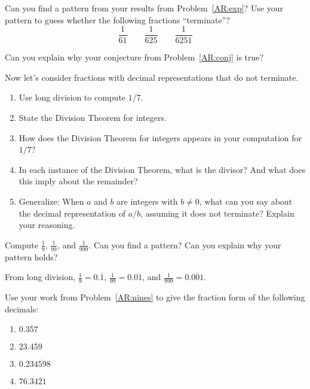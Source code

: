 \begin{prob}\label{AR:conj}
Can you find a pattern from your results from Problem~\ref{AR:exp}?
Use your pattern to guess whether the following fractions
``terminate''?  
\[
\dfrac{1}{61}\qquad \dfrac{1}{625} \qquad \dfrac{1}{6251}
\]
\end{prob}


\begin{prob}
Can you explain why your conjecture from Problem~\ref{AR:conj} is true?
\end{prob}

\begin{prob} Now let's consider fractions with decimal representations that do not terminate.  
\begin{enumerate}
\item Use long division to compute $1/7$.
\item {}
State the Division Theorem for integers.
\item How does the Division Theorem for integers appears in your computation for $1/7$?
\item In each instance of the Division Theorem, what 
is the divisor? And what does this imply about the remainder?
\item Generalize:  When $a$ and $b$ are integers with $b\ne 0$, 
what can you say about the decimal representation of $a/b$, assuming
it does not terminate?  Explain your reasoning.  
\end{enumerate}
\end{prob}

\begin{prob}\label{AR:nines} 
Compute $\frac{1}{9}$, $\frac{1}{99}$, and $\frac{1}{999}$. Can you
find a pattern? Can you explain why your pattern holds?
\end{prob}

\begin{teachingnote}
From long division, $\frac{1}{9} = 0.\overline{1}$, $\frac{1}{99} = 0.\overline{01}$, and $\frac{1}{999} = 0.\overline{001}$.  
\end{teachingnote}

\begin{prob}
Use your work from Problem~\ref{AR:nines} to give the fraction form of
the following decimals:
\begin{enumerate}
\item $0.\overline{357}$
\item $23.\overline{459}$
\item $0.23\overline{4598}$
\item $76.3\overline{421}$
\end{enumerate}
\end{prob}


